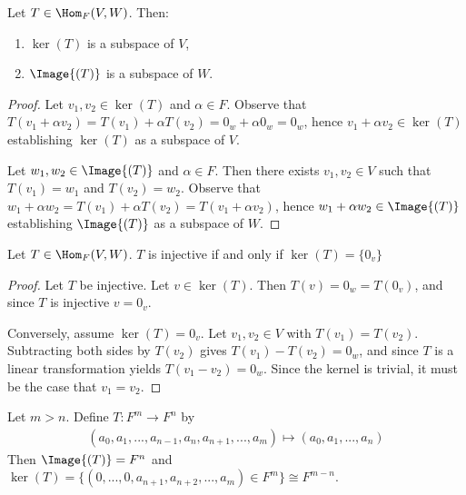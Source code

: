     \begin{lemma}
        Let $T \in \Hom_F{(V,W)}$. Then:
        \begin{enumerate}[label = (\arabic*)]
            \item $\ker{(T)}$ is a subspace of $V$,
            \item $\Image{(T)}$ is a subspace of $W$.
        \end{enumerate}
    \end{lemma}
        \begin{proof}
            Let $v_1, v_2 \in \ker{(T)}$ and $\alpha \in F$. Observe that $T(v_1 + \alpha v_2) = T(v_1) + \alpha T(v_2) = 0_w + \alpha 0_w = 0_w$, hence $v_1 + \alpha v_2 \in \ker{(T)}$ establishing $\ker{(T)}$ as a subspace of $V$.

            Let $w_1,w_2 \in \Image{(T)}$ and $\alpha \in F$. Then there exists $v_1, v_2 \in V$ such that $T(v_1) = w_1$ and $T(v_2) = w_2$. Observe that $w_1 + \alpha w_2 = T(v_1) + \alpha T(v_2) = T(v_1 + \alpha v_2)$, hence $w_1 + \alpha w_2 \in \Image{(T)}$ establishing $\Image{(T)}$ as a subspace of $W$.
        \end{proof}
    
    \begin{lemma}
        Let $T \in \Hom_F{(V,W)}$. $T$ is injective if and only if $\ker{(T)} = \{0_v\}$
    \end{lemma}
        \begin{proof}
            Let $T$ be injective. Let $v \in \ker{(T)}$. Then $T(v) = 0_w = T(0_v)$, and since $T$ is injective $v = 0_v$.

            Conversely, assume $\ker{(T)} = 0_v$. Let $v_1,v_2 \in V$ with $T(v_1) = T(v_2)$. Subtracting both sides by $T(v_2)$ gives $T(v_1) - T(v_2) = 0_w $, and since $T$ is a linear transformation yields $T(v_1 - v_2) = 0_w$. Since the kernel is trivial, it must be the case that $v_1 = v_2$. 
        \end{proof}

    \begin{example}
        Let $m > n$. Define $T: F^m \rightarrow F^n$ by 
            \begin{equation*}
            \begin{split}
                (a_0,a_1,...,a_{n-1},a_n,a_{n+1},...,a_m) \mapsto (a_0,a_1,...,a_n)
            \end{split}
            \end{equation*}
        Then $\Image{(T)} = F^n$ and $\ker{(T)} = \{(0,...,0,a_{n+1},a_{n+2},...,a_m) \in F^m\} \cong F^{m-n}$.
    \end{example}
